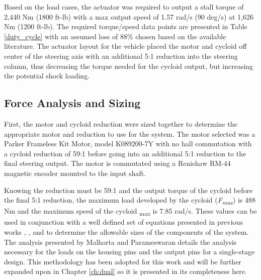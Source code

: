 Based on the load cases, the actuator was required to output a stall torque of 2,440 Nm (1800 ft-lb) with a max output speed of 1.57 rad/s (90 deg/s) at 1,626 Nm (1200 ft-lb).
The required torque/speed data points are presented in Table \ref{duty_cycle} with an assumed loss of 88\% chosen based on the available literature.
The actuator layout for the vehicle placed the motor and cycloid off center of the steering axis with an additional 5:1 reduction into the steering column, thus decreasing the torque needed for the cycloid output, but increasing the potential shock loading.

\subsection{Force Analysis and Sizing} \label{ch:design:single:force_analysis}

First, the motor and cycloid reduction were sized together to determine the appropriate motor and reduction to use for the system. The motor selected was a Parker Frameless Kit Motor, model K089200-7Y with no hall commutation with a cycloid reduction of 59:1 before going into an additional 5:1 reduction to the final steering output. The motor is commutated using a Renishaw RM-44 magnetic encoder mounted to the input shaft. 

Knowing the reduction must be 59:1 and the output torque of the cycloid before the final 5:1 reduction, the maximum load developed by the cycloid (\textit{F\textsubscript{max}}) is 488 Nm and the maximum speed of the cycloid {\textomega\textsubscript{max}} is 7.85 rad/s. These values can be used in conjunction with a well defined set of equations presented in previous works \cite{ref:malhorta}, \cite{ref:li}, and \cite{ref:unified_approach} to determine the allowable sizes of the components of the system. The analysis presented by Malhorta and Parameswaran details the analysis necessary for the loads on the housing pins and the output pins for a single-stage design. This methodology has been adopted for this work and will be further expanded upon in Chapter \ref{ch:dual} so it is presented in its completeness here. 

